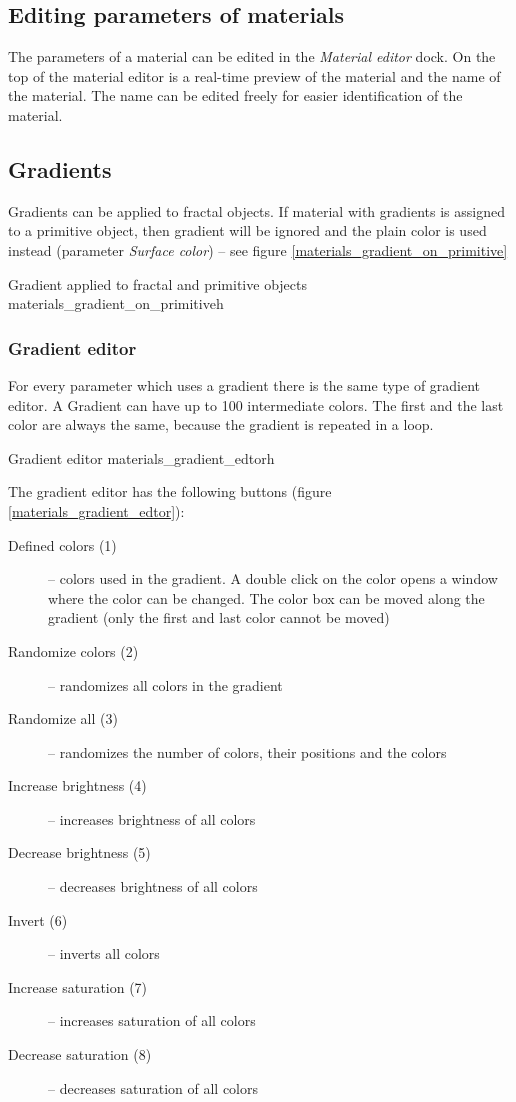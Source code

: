 \subsection{Editing parameters of materials}\label{materials-parameters}

The parameters of a material can be edited in the \emph{Material editor} dock. On the top of the material editor is a real-time preview of the material and the name of the material. The name can be edited freely for easier identification of the material.

\subsection{Gradients}\label{materials-gradients}

Gradients can be applied to fractal objects. If material with gradients is assigned to a primitive object, then gradient will be ignored and the plain color is used instead (parameter \emph{Surface color}) -- see figure \ref{materials_gradient_on_primitive}

{Gradient applied to fractal and primitive objects}
{materials_gradient_on_primitive}{h}

\subsubsection{Gradient editor}\label{materials-gradient-editor}

For every parameter which uses a gradient there is the same type of gradient editor. A Gradient can have up to 100 intermediate colors. The first and the last color are always the same, because the gradient is repeated in a loop.

{Gradient editor}
{materials_gradient_edtor}{h}

The gradient editor has the following buttons (figure \ref{materials_gradient_edtor}):
\nopagebreak
\begin{description}
	\item[Defined colors (1)] -- colors used in the gradient. A double click on the color opens a window where the color can be changed. The color box can be moved along the gradient (only the first and last color cannot be moved)
	\item[Randomize colors (2)] -- randomizes all colors in the gradient
	\item[Randomize all (3)] -- randomizes the number of colors, their positions and the colors
	\item[Increase brightness (4)] -- increases brightness of all colors
	\item[Decrease brightness (5)] -- decreases brightness of all colors
	\item[Invert (6)] -- inverts all colors
	\item[Increase saturation (7)] -- increases saturation of all colors
	\item[Decrease saturation (8)] -- decreases saturation of all colors
\end{description}


